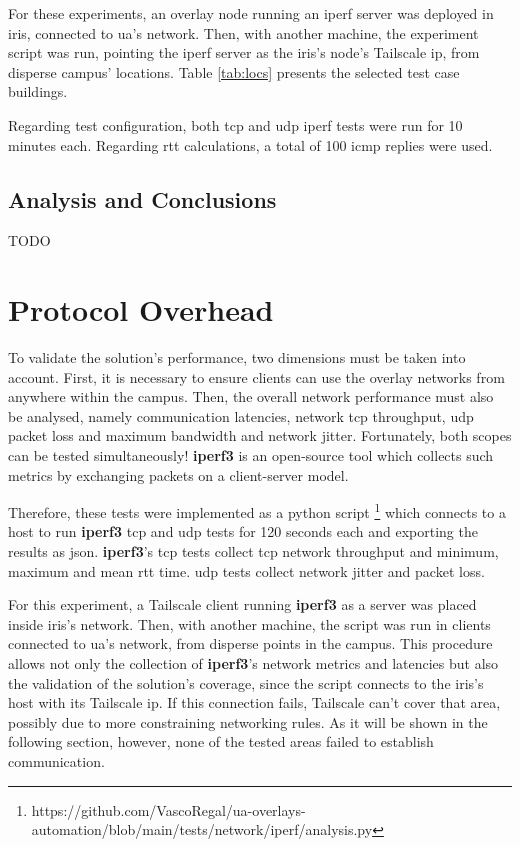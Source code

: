 \documentclass[11pt,twoside,a4paper]{report}
\begin{document}
For these experiments, an overlay node running an iperf server was deployed in \ac{iris}, connected to \ac{ua}'s network. Then, with another machine, the experiment script was run, pointing the iperf server as the \ac{iris}'s node's Tailscale \ac{ip}, from disperse campus' locations. Table \ref{tab:locs} presents the selected test case buildings.

Regarding test configuration, both \ac{tcp} and \ac{udp} iperf tests were run for 10 minutes each. Regarding \ac{rtt} calculations, a total of 100 \ac{icmp} replies were used.

\subsection{Analysis and Conclusions}


TODO

\iffalse
\section{Protocol Overhead}

To validate the solution's performance, two dimensions must be taken into account. First, it is necessary to ensure clients can use the overlay networks from anywhere within the campus. Then, the overall network performance must also be analysed, namely communication latencies, network \ac{tcp} throughput, \ac{udp} packet loss and maximum bandwidth and network jitter. Fortunately, both scopes can be tested simultaneously! \textbf{iperf3} is an open-source tool which collects such metrics by exchanging packets on a client-server model.

Therefore, these tests were implemented as a python script \footnote{https://github.com/VascoRegal/ua-overlays-automation/blob/main/tests/network/iperf/analysis.py} which connects to a host to run \textbf{iperf3} \ac{tcp} and \ac{udp} tests for 120 seconds each and exporting the results as \ac{json}. \textbf{iperf3}'s \ac{tcp} tests collect \ac{tcp} network throughput and minimum, maximum and mean \ac{rtt} time. \ac{udp} tests collect network jitter and packet loss.

For this experiment, a Tailscale client running \textbf{iperf3} as a server was placed inside \ac{iris}'s network. Then, with another machine, the script was run in clients connected to \ac{ua}'s network, from disperse points in the campus. This procedure allows not only the collection of \textbf{iperf3}'s network metrics and latencies but also the validation of the solution's coverage, since the script connects to the \ac{iris}'s host with its Tailscale \ac{ip}. If this connection fails, Tailscale can't cover that area, possibly due to more constraining networking rules. As it will be shown in the following section, however, none of the tested areas failed to establish communication.
\end{document}
